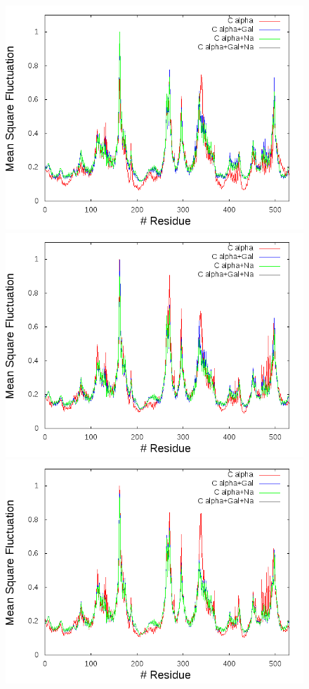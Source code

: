 \begin{figure}
     \includegraphics[scale=0.3]{./Kap4/ANM/ANM_server/grafica_12_A_n.png}
      \includegraphics[scale=0.3]{./Kap4/ANM/ANM_server/grafica_13_A_n.png}
      \includegraphics[scale=0.3]{./Kap4/ANM/ANM_server/grafica_14_A_n.png}

\end{figure}
